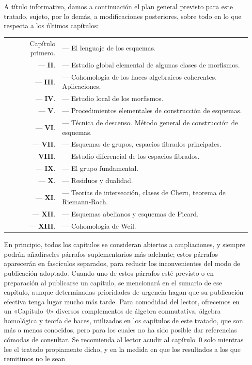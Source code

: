 A título informativo, damos a continuación el plan general previsto para este tratado, sujeto, por lo demás, a modificaciones posteriores, sobre todo en lo que respecta a los últimos capítulos:

\medskip
\begin{tabular}{rl}
  Capítulo primero. & --- El lenguaje de los esquemas.\\
  --- \textbf{II}. & --- Estudio global elemental de algunas clases de morfismos.\\
  --- \textbf{III}. & --- Cohomología de los haces algebraicos coherentes. Aplicaciones.\\
  --- \textbf{IV}. & --- Estudio local de los morfismos.\\
  --- \textbf{V}. & --- Procedimientos elementales de construcción de esquemas.\\
  --- \textbf{VI}. & --- Técnica de descenso. Método general de construcción de esquemas.\\
  --- \textbf{VII}. & --- Esquemas de grupos, espacios fibrados principales.\\
  --- \textbf{VIII}. & --- Estudio diferencial de los espacios fibrados.\\
  --- \textbf{IX}. & --- El grupo fundamental.\\
  --- \textbf{X}. & --- Residuos y dualidad.\\
  --- \textbf{XI}. & --- Teorías de intersección, clases de Chern, teorema de Riemann-Roch.\\
  --- \textbf{XII}. & --- Esquemas abelianos y esquemas de Picard.\\
  --- \textbf{XIII}. & --- Cohomología de Weil.\\
\end{tabular}
\medskip

En principio, todos los capítulos se consideran abiertos a ampliaciones, y siempre podrán añadírseles párrafos suplementarios más adelante; estos párrafos aparecerán en fascículos separados, para reducir los inconvenientes del modo de publicación adoptado.
Cuando uno de estos párrafos esté previsto o en preparación al publicarse un capítulo, se mencionará en el sumario de ese capítulo, aunque determinadas prioridades de urgencia hagan que su publicación efectiva tenga lugar mucho más tarde.
Para comodidad del lector, ofrecemos en un «Capítulo~0» diversos complementos de álgebra conmutativa, álgebra homológica y teoría de haces, utilizados en los capítulos de este tratado, que son más o menos conocidos, pero para los cuales no ha sido posible dar referencias cómodas de consultar.
Se recomienda al lector acudir al capítulo~0 solo mientras lee el tratado propiamente dicho, y en la medida en que los resultados a los que remitimos no le sean


